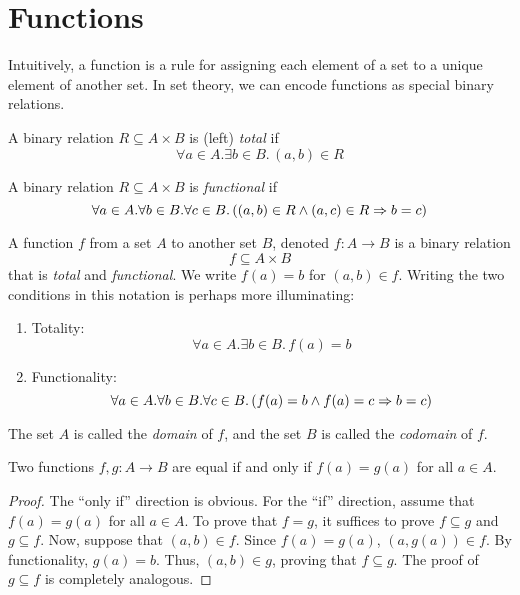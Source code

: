 \documentclass{amsart}
\begin{document}
\section{Functions}
\label{sec:functions}

Intuitively, a function is a rule for assigning each element of a set to a unique element of another set.
In set theory, we can encode functions as special binary relations.

\begin{defn}
  A binary relation $R \subseteq A \times B$ is (left) \emph{total} if
  \[
    \forall a \in A.\exists b \in B.\,(a,b) \in R
  \]
\end{defn}

\begin{defn}
  A binary relation $R \subseteq A \times B$ is \emph{functional} if
  \[
    \forall a \in A.\forall b \in B.\forall c \in B.\,((a,b) \in R \wedge (a,c) \in R \Rightarrow b = c)
  \]
\end{defn}

\begin{defn}
  A function $f$ from a set $A$ to another set $B$, denoted $f : A \to B$ is a binary relation
  \[
    f \subseteq A \times B
  \]
  that is \emph{total} and \emph{functional}.
  We write $f(a) = b$ for $(a,b) \in f$.
  Writing the two conditions in this notation is perhaps more illuminating:
  \begin{enumerate}
  \item Totality:
    \[
      \forall a \in A.\exists b \in B.\,f(a) = b
    \]
  \item Functionality:
    \[
      \forall a \in A.\forall b \in B.\forall c \in B.\,(f(a) = b \wedge f(a) = c \Rightarrow b = c)
    \]
  \end{enumerate}
  The set $A$ is called the \emph{domain} of $f$, and the set $B$ is called the \emph{codomain} of $f$.
\end{defn}

\begin{thm}
  Two functions $f,g : A \to B$ are equal if and only if $f(a) = g(a)$ for all $a \in A$.
\end{thm}
\begin{proof}
  The ``only if'' direction is obvious.
  For the ``if'' direction, assume that $f(a) = g(a)$ for all $a \in A$.
  To prove that $f = g$, it suffices to prove $f \subseteq g$ and $g \subseteq f$.
  Now, suppose that $(a,b) \in f$.
  Since $f(a) = g(a)$, $(a, g(a)) \in f$.
  By functionality, $g(a) = b$.
  Thus, $(a,b) \in g$, proving that $f \subseteq g$.
  The proof of $g \subseteq f$ is completely analogous.
\end{proof}
\end{document}
